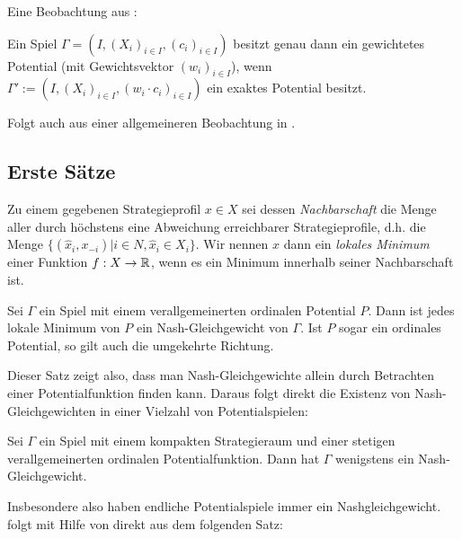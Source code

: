 
Eine Beobachtung aus \cite{CharExGewPotinWCG}:

\begin{beob}\label{beob:ZshExGewPot}
	Ein Spiel $\Gamma = (I, (X_i)_{i \in I}, (c_i)_{i \in I})$ besitzt genau dann ein gewichtetes Potential (mit Gewichtsvektor $(w_i)_{i \in I}$), wenn $\Gamma' := (I, (X_i)_{i \in I}, (w_i \cdot c_i)_{i \in I})$ ein exaktes Potential besitzt.
\end{beob}

Folgt auch aus einer allgemeineren Beobachtung in .

\subsection{Erste Sätze}

Zu einem gegebenen Strategieprofil $x \in X$ sei dessen \emph{Nachbarschaft} die Menge aller durch höchstens eine Abweichung erreichbarer Strategieprofile, d.h. die Menge $\{(\hat{x}_i, x_{-i}) | i \in N, \hat{x}_i \in X_i\}$. Wir nennen $x$ dann ein \emph{lokales Minimum} einer Funktion $f: X \to \mathbb{R}$, wenn es ein Minimum innerhalb seiner Nachbarschaft ist.

\begin{satz}\label{satz:lokMinNG}
	Sei $\Gamma$ ein Spiel mit einem verallgemeinerten ordinalen Potential $P$. Dann ist jedes lokale Minimum von $P$ ein Nash-Gleichgewicht von $\Gamma$. Ist $P$ sogar ein ordinales Potential, so gilt auch die umgekehrte Richtung.
\end{satz}


Dieser Satz zeigt also, dass man Nash-Gleichgewichte allein durch Betrachten einer Potentialfunktion finden kann. Daraus  folgt direkt die Existenz von Nash-Gleichgewichten in einer Vielzahl von Potentialspielen:

\begin{kor}
	Sei $\Gamma$ ein Spiel mit einem kompakten Strategieraum und einer stetigen verallgemeinerten ordinalen Potentialfunktion. Dann hat $\Gamma$ wenigstens ein Nash-Gleichgewicht.
\end{kor}

Insbesondere also haben endliche Potentialspiele immer ein Nashgleichgewicht.  folgt mit Hilfe von  direkt aus dem folgenden Satz:

